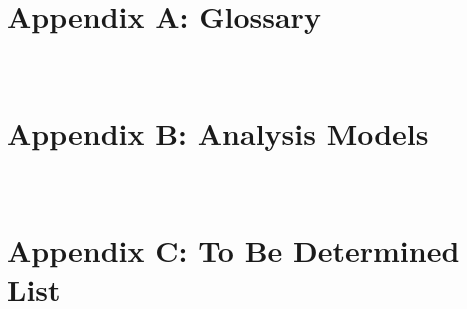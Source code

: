 \documentclass{report}
\begin{document}
\section{Appendix A: Glossary} ~~~

\section{Appendix B: Analysis Models} ~~~

\section{Appendix C: To Be Determined List} ~~~
\end{document}
